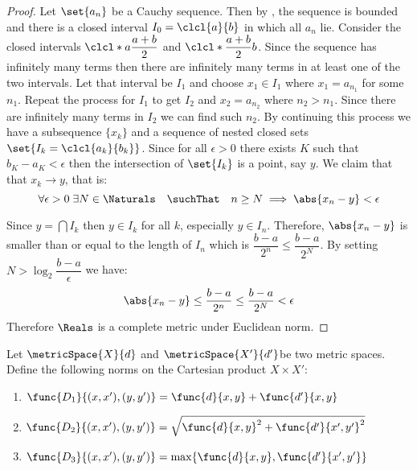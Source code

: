 \begin{proof} \label{RealComplete}
    Let \(\set{ a_n }\) be a Cauchy sequence. Then by , the sequence is bounded and there is a closed interval \(I_0 = \clcl{a}{b} \) in which all \(a_n\) lie. Consider the closed intervals \(\clcl*{a}{\dfrac{a + b}{2}} \) and \(\clcl*{\dfrac{a + b}{2}}{b}\). Since the sequence has infinitely many terms then there are infinitely many terms in at least one of the two intervals. Let that interval be \(I_1\) and choose \(x_1 \in I_1\) where \(x_1 = a_{n_1}\) for some \(n_1\).
    Repeat the process for \(I_1\) to get \(I_2 \) and \(x_2 = a_{n_2}\) where \(n_2 > n_1\). Since there are infinitely many terms in \(I_2\) we can find such \(n_2\). By continuing this process we have a subsequence \(\{ x_k \}\) and a sequence of nested closed sets \(\set{ I_k = \clcl{a_k}{b_k}}\). Since for all \(\epsilon > 0\) there exists \(K\) such that \(b_K - a_K < \epsilon\) then the intersection of \(\set{I_k}\) is a point, say \(y\). We claim that that \(x_k \to y\), that is:
    \begin{equation*}
        \forall \epsilon > 0 \; \exists N \in \Naturals \quad \suchThat \quad n \geq N \implies \abs{x_n - y} < \epsilon  
    \end{equation*}
    
    Since \(y = \bigcap I_k\) then \(y \in I_k\) for all \(k\), especially \(y \in I_n\). Therefore, \(\abs{x_n - y}\) is smaller than or equal to the length of \(I_n\) which is \(\dfrac{b - a}{2^n} \leq \dfrac{b-a}{2^N}\). By setting \(N > \log_2{\dfrac{b-a}{\epsilon}}\) we have:
    \begin{equation*}
        \abs{x_n - y} \leq \dfrac{b - a}{2^n} \leq \dfrac{b-a}{2^N} < \epsilon
    \end{equation*}
    Therefore \(\Reals\) is a complete metric under Euclidean norm.
\end{proof}


Let \(\metricSpace{X}{d}\) and \(\metricSpace{X'}{d'}\)be two metric spaces. Define the following norms on the Cartesian product \(X \times X'\):
\begin{enumerate}
    \item \(\func{D_1}{(x,x'),(y,y')} = \func{d}{x,y} + \func{d'}{x,y}\)
    \item \(\func{D_2}{(x,x'),(y,y')} = \sqrt{\func{d}{x,y}^2 +\func{d'}{x',y'}^2}\)
    \item \(\func{D_3}{(x,x'),(y,y')} = \max \{ \func{d}{x,y} , \func{d'}{x',y'}\}\)
\end{enumerate}


